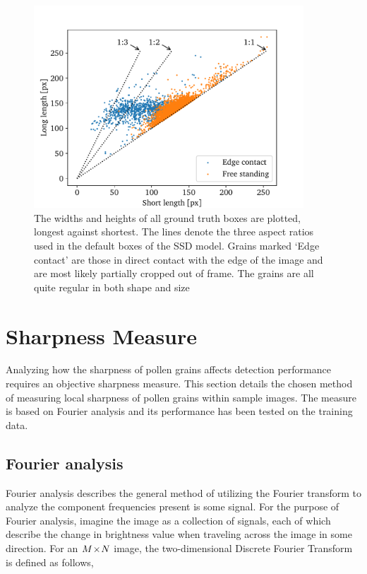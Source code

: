 \begin{figure}[htb]
  \centering
  \includegraphics[width=0.9\textwidth]{figs/method/aspect_ratio.pdf}
  \caption[Aspect ratios in the dataset]{The widths and heights of all ground truth boxes are plotted, longest against shortest.
The lines denote the three aspect ratios used in the default boxes of the SSD model.
Grains marked `Edge contact' are those in direct contact with the edge of the image and are most likely partially cropped out of frame.
The grains are all quite regular in both shape and size}\label{fig:aspect}
\end{figure}

\section{Sharpness Measure}\label{sec:method-sharpness}
Analyzing how the sharpness of pollen grains affects detection performance requires an objective sharpness measure.
This section details the chosen method of measuring local sharpness of pollen grains within sample images.
The measure is based on Fourier analysis and its performance has been tested on the training data.

\subsection{Fourier analysis}
Fourier analysis describes the general method of utilizing the Fourier transform to analyze the component frequencies present is some signal.
For the purpose of Fourier analysis, imagine the image as a collection of signals, each of which describe the change in brightness value when traveling across the image in some direction.
For an \(M\!\times \! N\) image, the two-dimensional Discrete Fourier Transform is defined as follows,

